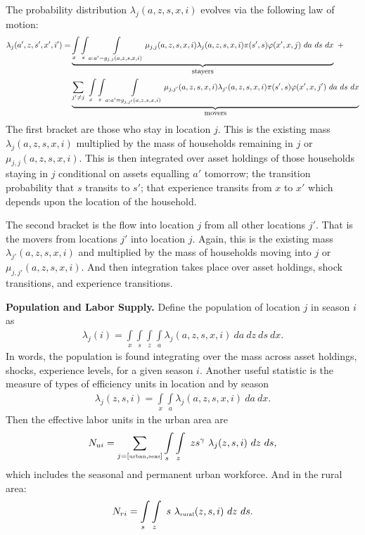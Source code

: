 \documentclass[12pt,pdftex]{article}
\begin{document}
\begin{onehalfspacing}
The probability distribution $\lambda_{j}(a, z, s, x, i)$ evolves via the following law of motion:
\begin{align}
\lambda_{j}(a', z, s', x', i')  =  & \underbrace{ \int\limits_{x} \int\limits_{s} \int\limits_{a: a' = g_{j,j}(a, z, s, x, i)} \mu_{j,j}(a, z, s, x, i) \lambda_{j}(a, z, s, x, i) \pi(s',s) \varphi(x',x, j)\ da \ ds \ dx }_{\small \mbox{stayers}} \ + \nonumber \\
& \underbrace{\sum_{j' \neq j}\  \int\limits_{x} \int\limits_{s} \int\limits_{a: a' = g_{j,j'}(a, z, s, x, i)}  \mu_{j,j'}(a, z, s, x, i) \lambda_{j'}(a, z, s, x, i) \pi(s',s) \varphi(x',x, j') \ da \ ds \ dx }_{\small \mbox{movers}}
\label{eq:dce_law_motion}
\end{align}
The first bracket are those who stay in location $j$. This is the existing mass $\lambda_{j}(a, z, s, x, i)$ multiplied by the mass of households remaining in $j$ or $\mu_{j,j}(a, z, s, x, i)$. This is then integrated over asset holdings of those households staying in $j$ conditional on assets equalling $a'$ tomorrow; the transition probability that $s$ transits to $s'$; that experience transits from $x$ to $x'$ which depends upon the location of the household.

The second bracket is the flow into location $j$ from all other locations $j'$. That is the movers from locations $j'$ into location $j$. Again, this is the existing mass $\lambda_{j'}(a, z, s, x, i)$ and multiplied by the mass of households moving into $j$ or $\mu_{j,j'}(a, z, s, x, i)$. And then integration takes place over asset holdings, shock transitions, and experience transitions.

\textbf{Population and Labor Supply.} Define the population of location $j$ in season $i$ as
\begin{align}
\lambda_j(i) = \int\limits_{x} \int\limits_{s} \int\limits_{z} \int\limits_{a}  \lambda_j(a, z, s, x, i)  \ da  \ dz \ ds \ dx.
\label{eq:island_populaiton}
\end{align}
In words, the population is found integrating over the mass across asset holdings, shocks, experience levels, for a given season $i$. Another useful statistic is the measure of types of efficiency units in location and by season
\begin{align}
\lambda_j(z, s, i) = \int\limits_{x}  \int\limits_{a}  \lambda_j(a, z, s, x, i) \ da  \ dx.
\end{align}
Then the effective labor units in the urban area are
\begin{align}
N_{ui} = \sum_{j = [\mbox{\tiny urban}, \mbox{\tiny seas}]}\int\limits_{s} \int\limits_{z} \  z s^{\gamma} \ \lambda_j(z, s, i) \ dz \ ds,
\label{eq:urban_units}
\end{align}
which includes the seasonal and permanent urban workforce. And in the rural area:
\begin{align}
N_{ri} = \int\limits_{s} \int\limits_{z}  \  s \ \lambda_{\mbox{\tiny rural}}(z, s, i) \ dz \ ds.
\label{eq:rural_units}
\end{align}


\end{onehalfspacing}
\end{document}
